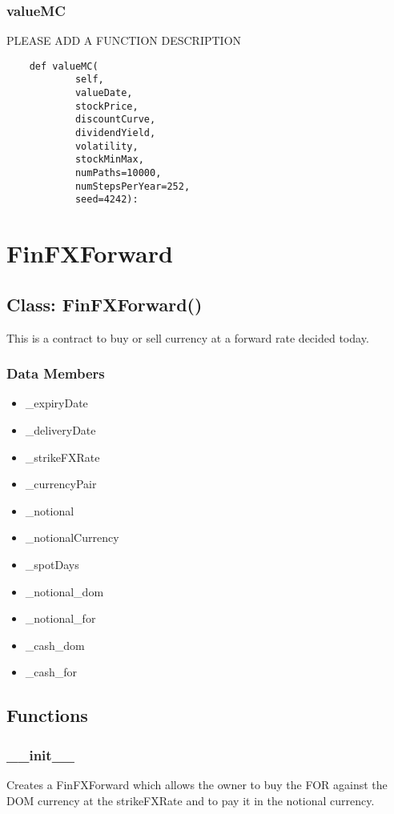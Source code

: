 \documentclass[twoside,11pt]{book}
\begin{document}
\subsubsection*{{\bf valueMC}}
PLEASE ADD A FUNCTION DESCRIPTION

\begin{lstlisting}
    def valueMC(
            self,
            valueDate,
            stockPrice,
            discountCurve,
            dividendYield,
            volatility,
            stockMinMax,
            numPaths=10000,
            numStepsPerYear=252,
            seed=4242):
\end{lstlisting}

\newpage
\section{FinFXForward}

\subsection*{Class: FinFXForward()}
This is a contract to buy or sell currency at a forward rate decided today.  

\subsubsection*{Data Members}
\begin{itemize}
\item{\_expiryDate}
\item{\_deliveryDate}
\item{\_strikeFXRate}
\item{\_currencyPair}
\item{\_notional}
\item{\_notionalCurrency}
\item{\_spotDays}
\item{\_notional\_dom}
\item{\_notional\_for}
\item{\_cash\_dom}
\item{\_cash\_for}
\end{itemize}

\subsection*{Functions}

\subsubsection*{{\bf \_\_init\_\_}}
Creates a FinFXForward which allows the owner to buy the FOR against the DOM currency at the strikeFXRate and to pay it in the notional currency.  
\end{document}
